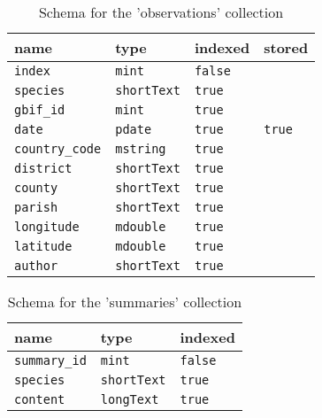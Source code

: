 \begin{table}[H]
  \caption{Schema for the 'observations' collection}
  \label{tab:observations-schema}
  \begin{tabular}{llll}
    \toprule
    name & type & indexed & stored \\
    \midrule
    \texttt{index} & \texttt{mint} & \texttt{false} & \\
    \texttt{species} & \texttt{shortText} & \texttt{true} & \\
    \texttt{gbif\_id} & \texttt{mint} & \texttt{true} & \\
    \texttt{date} & \texttt{pdate} & \texttt{true} & \texttt{true} \\
    \texttt{country\_code} & \texttt{mstring} & \texttt{true} & \\
    \texttt{district} & \texttt{shortText} & \texttt{true} & \\
    \texttt{county} & \texttt{shortText} & \texttt{true} & \\
    \texttt{parish} & \texttt{shortText} & \texttt{true} & \\
    \texttt{longitude} & \texttt{mdouble} & \texttt{true} & \\
    \texttt{latitude} & \texttt{mdouble} & \texttt{true} & \\
    \texttt{author} & \texttt{shortText} & \texttt{true} & \\
    \bottomrule
  \end{tabular}
\end{table}


\begin{table}[H]
  \caption{Schema for the 'summaries' collection}
  \label{tab:summaries-schema}
  \begin{tabular}{lll}
    \toprule
    name & type & indexed \\
    \midrule
    \texttt{summary\_id} & \texttt{mint} & \texttt{false} \\
    \texttt{species} & \texttt{shortText} & \texttt{true} \\
    \texttt{content} & \texttt{longText} & \texttt{true} \\
    \bottomrule
  \end{tabular}
\end{table}

